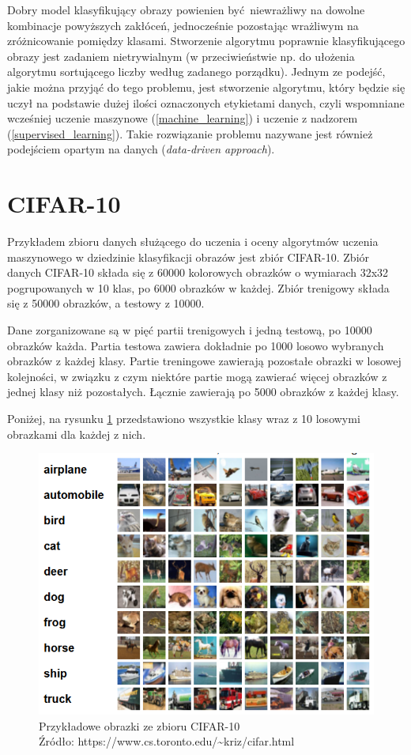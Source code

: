 Dobry model klasyfikujący obrazy powienien być niewrażliwy na dowolne kombinacje powyższych zakłóceń, jednocześnie pozostając wrażliwym na zróżnicowanie pomiędzy klasami.
Stworzenie algorytmu poprawnie klasyfikującego obrazy jest zadaniem nietrywialnym (w przeciwieństwie np. do ułożenia algorytmu sortującego liczby według zadanego porządku).
Jednym ze podejść, jakie można przyjąć do tego problemu, jest stworzenie algorytmu, który będzie się uczył na podstawie dużej ilości oznaczonych etykietami danych, czyli wspomniane wcześniej uczenie maszynowe (\ref{machine_learning}) i uczenie z nadzorem (\ref{supervised_learning}).
Takie rozwiązanie problemu nazywane jest również podejściem opartym na danych (\textit{data-driven approach}).
\cite{cs231n}


\section{CIFAR-10}
Przykładem zbioru danych służącego do uczenia i oceny algorytmów uczenia maszynowego w dziedzinie klasyfikacji obrazów jest zbiór CIFAR-10.
Zbiór danych CIFAR-10 składa się z 60000 kolorowych obrazków o wymiarach 32x32 pogrupowanych w 10 klas, po 6000 obrazków w każdej. Zbiór trenigowy składa się z 50000 obrazków, a testowy z 10000.

Dane zorganizowane są w pięć partii trenigowych i jedną testową, po 10000 obrazków każda. Partia testowa zawiera dokładnie po 1000 losowo wybranych obrazków z każdej klasy. Partie treningowe zawierają pozostałe obrazki w losowej kolejności, w związku z czym niektóre partie mogą zawierać więcej obrazków z jednej klasy niż pozostałych. Łącznie zawierają po 5000 obrazków z każdej klasy.

Poniżej, na rysunku \ref{fig:sample_data} przedstawiono wszystkie klasy wraz z 10 losowymi obrazkami dla każdej z nich.
\begin{figure}[h!tb]
	 \centering
	 \includegraphics[width = 1.0\linewidth]{img/sample_images}
	 \caption{Przykładowe obrazki ze zbioru CIFAR-10 \\
              Źródło: https://www.cs.toronto.edu/\textasciitilde kriz/cifar.html}
	 \label{fig:sample_data}
\end{figure}

